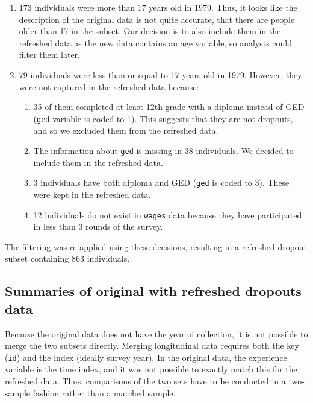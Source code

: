 \documentclass[12pt]{article}
\providecommand{\tightlist}{%
  \setlength{\itemsep}{0pt}\setlength{\parskip}{0pt}}
\begin{document}
\begin{enumerate}
\def\labelenumi{\arabic{enumi}.}
\tightlist
\item
  173 individuals were more than 17 years old in 1979. Thus, it looks like the description of the original data is not quite accurate, that there are people older than 17 in the subset. Our decision is to also include them in the refreshed data as the new data contains an age variable, so analysts could filter them later.
\item
  79 individuals were less than or equal to 17 years old in 1979. However, they were not captured in the refreshed data because:

  \begin{enumerate}
  \def\labelenumii{\roman{enumii}.}
  \tightlist
  \item
    35 of them completed at least 12th grade with a diploma instead of GED (\texttt{ged} variable is coded to 1). This suggests that they are not dropouts, and so we excluded them from the refreshed data.
  \item
    The information about \texttt{ged} is missing in 38 individuals. We decided to include them in the refreshed data.
  \item
    3 individuals have both diploma and GED (\texttt{ged} is coded to 3). These were kept in the refreshed data.
  \item
    12 individuals do not exist in \texttt{wages} data because they have participated in less than 3 rounds of the survey.
  \end{enumerate}
\end{enumerate}

The filtering was re-applied using these decisions, resulting in a refreshed dropout subset containing 863 individuals.

\hypertarget{summaries-of-original-with-refreshed-dropouts-data}{%
\subsection{Summaries of original with refreshed dropouts data}\label{summaries-of-original-with-refreshed-dropouts-data}}

Because the original data does not have the year of collection, it is not possible to merge the two subsets directly. Merging longitudinal data requires both the key (\texttt{id}) and the index (ideally survey year). In the original data, the experience variable is the time index, and it was not possible to exactly match this for the refreshed data. Thus, comparisons of the two sets have to be conducted in a two-sample fashion rather than a matched sample.
\end{document}
